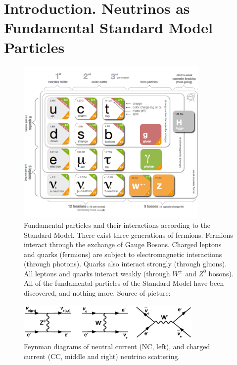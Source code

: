 \section{Introduction. Neutrinos as Fundamental Standard Model Particles}
\begin{figure}
\caption{Fundamental particles and their interactions according to the Standard Model. There exist three generations of fermions. Fermions interact through the exchange of Gauge Bosons. Charged leptons and quarks (fermions) are subject to electromagnetic interactions (through photons). Quarks also interact strongly (through gluons). All leptons and quarks interact weakly (through $W^{\pm}$ and $Z^0$ bosons). All of the fundamental particles of the Standard Model have been discovered, and nothing more. Source of picture: \cite{ref_fig_StandardModel}}
\label{fig:StandardModel}
\centering 
\includegraphics[width=0.83\textwidth, keepaspectratio=true]{figs/StandardModel.png}
\end{figure}
\begin{figure}
\caption{Feynman diagrams of neutral current (NC, left), and charged current (CC, middle and right) neutrino scattering.}
\label{fig:NuScattering}
\centering
\includegraphics[width=0.80\textwidth, keepaspectratio=true]{figs/neutrinoScattering.png}
\end{figure}
